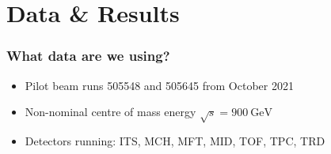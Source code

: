 \documentclass[11pt]{beamer}
\begin{document}
\section{Data \& Results}

\begin{frame}
    \frametitle{What data are we using?}

    \begin{itemize}
        \item Pilot beam runs 505548 and 505645 from October 2021
        \item Non-nominal centre of mass energy $\sqrt{s}=\SI{900}{\giga\electronvolt}$
        \item Detectors running: ITS, MCH, MFT, MID, TOF, TPC, TRD
    \end{itemize}

\end{frame}
\end{document}
